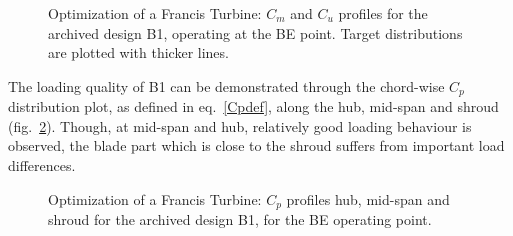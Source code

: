 \begin{figure}[h!]
\begin{minipage}[b]{1\linewidth}
 \centering
\end{minipage}
\caption{Optimization of a Francis Turbine: $C_m$ and $C_u$ profiles for the archived design B1, operating at the BE point. Target distributions are plotted with thicker lines.}
\label{Francis-B1-OUT}
\end{figure}

The loading quality of B1 can be demonstrated through the chord-wise $C_p$ distribution plot, as defined in eq.\ \ref{Cpdef}, along the hub, mid-span and shroud (fig.\ \ref{Francis-B1-LOAD}). Though, at mid-span and hub, relatively good loading behaviour is observed, the blade part which is close to the shroud suffers from important load differences.      

\begin{figure}[h!]
\begin{minipage}[b]{1\linewidth}
 \centering
\end{minipage}
\caption{Optimization of a Francis Turbine: $C_p$ profiles hub, mid-span and shroud for the archived design B1, for the BE operating point.}
\label{Francis-B1-LOAD}
\end{figure}

